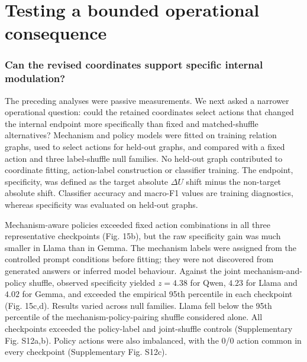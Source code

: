 \documentclass[11pt]{article}
\begin{document}
\FloatBarrier

\section{Testing a bounded operational consequence}
\subsubsection*{Can the revised coordinates support specific internal modulation?}
The preceding analyses were passive measurements. We next asked a narrower operational question: could the retained coordinates select actions that changed the internal endpoint more specifically than fixed and matched-shuffle alternatives? Mechanism and policy models were fitted on training relation graphs, used to select actions for held-out graphs, and compared with a fixed action and three label-shuffle null families. No held-out graph contributed to coordinate fitting, action-label construction or classifier training. The endpoint, specificity, was defined as the target absolute \(\Delta U\) shift minus the non-target absolute shift. Classifier accuracy and macro-F1 values are training diagnostics, whereas specificity was evaluated on held-out graphs.

Mechanism-aware policies exceeded fixed action combinations in all three representative checkpoints (Fig. 15b), but the raw specificity gain was much smaller in Llama than in Gemma. The mechanism labels were assigned from the controlled prompt conditions before fitting; they were not discovered from generated answers or inferred model behaviour. Against the joint mechanism-and-policy shuffle, observed specificity yielded \(z=4.38\) for Qwen, \(4.23\) for Llama and \(4.02\) for Gemma, and exceeded the empirical 95th percentile in each checkpoint (Fig. 15c,d). Results varied across null families. Llama fell below the 95th percentile of the mechanism-policy-pairing shuffle considered alone. All checkpoints exceeded the policy-label and joint-shuffle controls (Supplementary Fig. S12a,b). Policy actions were also imbalanced, with the 0/0 action common in every checkpoint (Supplementary Fig. S12c).
\end{document}
